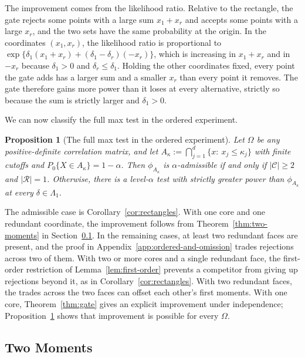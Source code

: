 \documentclass[11pt]{article}
\newcommand{\red}[1]{{\color{red}#1}} %
\numberwithin{equation}{section}
\newtheorem{proposition}{Proposition}
\theoremstyle{definition}
\begin{document}
The improvement comes from the likelihood ratio. Relative to the rectangle, the gate rejects some points with a large sum $x_1+x_r$ and accepts some points with a large $x_r$, and the two sets have the same probability at the origin. In the coordinates $(x_1,x_r)$, the likelihood ratio is proportional to $\exp\{\delta_1(x_1+x_r)+(\delta_1-\delta_r)(-x_r)\}$, which is increasing in $x_1+x_r$ and in $-x_r$ because $\delta_1>0$ and $\delta_r\le\delta_1$. Holding the other coordinates fixed, every point the gate adds has a larger sum and a smaller $x_r$ than every point it removes. The gate therefore gains more power than it loses at every alternative, strictly so because the sum is strictly larger and $\delta_1>0$.

\red{%
We can now classify the full max test in the ordered experiment.

\begin{proposition}[The full max test in the ordered experiment]\label{prop:max-ordered}
Let $\Omega$ be any positive-definite correlation matrix, and let $A_\kappa:=\bigcap_{j=1}^d\{x:\ x_j\le\kappa_j\}$ with finite cutoffs and $P_0\{X\in A_\kappa\}=1-\alpha$. Then $\phi_{A_\kappa}$ is $\alpha$-admissible if and only if $|\mathcal C|\ge2$ and $|\mathcal R|=1$. Otherwise, there is a level-$\alpha$ test with strictly greater power than $\phi_{A_\kappa}$ at every $\delta\in\Lambda_1$.
\end{proposition}

The admissible case is Corollary~\ref{cor:rectangles}. With one core and one redundant coordinate, the improvement follows from Theorem~\ref{thm:two-moments} in Section~\ref{sec:two-moments}. In the remaining cases, at least two redundant faces are present, and the proof in Appendix~\ref{app:ordered-and-omission} trades rejections across two of them. With two or more cores and a single redundant face, the first-order restriction of Lemma~\ref{lem:first-order} prevents a competitor from giving up rejections beyond it, as in Corollary~\ref{cor:rectangles}. With two redundant faces, the trades across the two faces can offset each other's first moments. With one core, Theorem~\ref{thm:gate} gives an explicit improvement under independence; Proposition~\ref{prop:max-ordered} shows that improvement is possible for every $\Omega$.
}


\subsection{Two Moments}\label{sec:two-moments}
\end{document}
